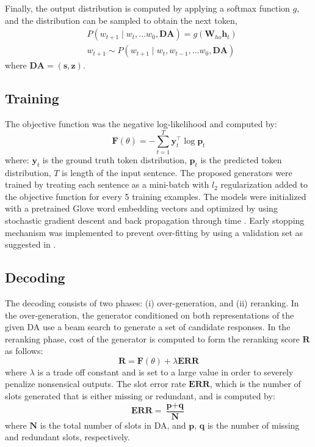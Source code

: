 \documentclass[11pt,a4paper]{article}
\begin{document}
Finally, the output distribution is computed by applying a softmax function $g$, and the distribution can be sampled to obtain the next token,
\begin{equation}\label{eq:p-t-1}
\begin{aligned}
& P(w_{t+1}\mid w_{t},...w_{0},\textbf{DA})=g(\textbf{W}_{ho}\textbf{h}_{t}) \\
& w_{t+1} \sim P(w_{t+1}\mid w_{t}, w_{t-1},...w_{0},\textbf{DA})
\end{aligned}
\end{equation}
where $\textbf{DA}=(\textbf{s}, \textbf{z})$.
\subsection{Training}\label{subsec:training}
The objective function was the negative log-likelihood and computed by:
\begin{equation}\label{eq:c-f-1}
\textbf{F}(\theta) = -\sum_{t=1}^{T}\textbf{y}_{t}^{\top}\log{\textbf{p}_{t}}
\end{equation}
where: $\textbf{y}_{t}$ is the ground truth token distribution, $\textbf{p}_{t}$ is the predicted token distribution, $T$ is length of the input sentence. The proposed generators were trained by treating each sentence as a mini-batch with \textit{$l_{2}$} regularization added to the objective function for every 5 training examples. The models were initialized with a pretrained Glove word embedding vectors \cite{pennington2014glove} and optimized by using stochastic gradient descent and back propagation through time \cite{werbos1990backpropagation}. Early stopping mechanism was implemented to prevent over-fitting by using a validation set as suggested in \cite{mikolov2010recurrent}.

\subsection{Decoding}\label{subsec:decoding}
The decoding consists of two phases: (i) over-generation, and (ii) reranking. In the over-generation, the generator conditioned on both representations of the given DA use a beam search to generate a set of candidate responses. In the reranking phase, cost of the generator is computed to form the reranking score $\textbf{R}$ as follows:
\begin{equation}\label{eq:r-score-1}
\textbf{R} = \textbf{F}(\theta) + \lambda \textbf{ERR}
\end{equation}
where $\lambda$ is a trade off constant and is set to a large value in order to severely penalize nonsensical outputs. The slot error rate $\textbf{ERR}$, which is the number of slots generated that is either missing or redundant, and is computed by:
\begin{equation}
\textbf{ERR} = \frac{\textbf{p} + \textbf{q}}{\textbf{N}}
\end{equation}
where $\textbf{N}$ is the total number of slots in DA, and $\textbf{p}$, $\textbf{q}$ is the number of missing and redundant slots, respectively. 
\end{document}
